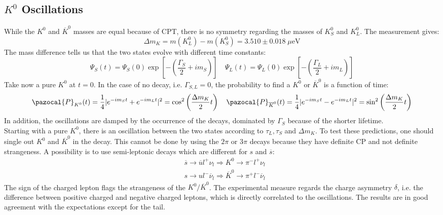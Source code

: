 \documentclass[10.75pt,a4paper,openright,bottom=2cm]{article}
\begin{document}
\subsection{$K^0$ Oscillations}
While the $K^0$ and $\overline{K}^0$ masses are equal because of CPT, there is no symmetry regarding the masses of $K_S^0$ and $K_L^0$. The measurement gives:
\[
\Delta m_K=m(K_L^0)-m(K_S^0)=3.510\pm0.018\;\text{$\mu$eV}
\]
The mass difference tells us that the two states evolve with different time constants:
\[
\Psi_S(t)=\Psi_S(0)\exp\left[-\left(\frac{\Gamma_S}{2}+im_S\right)\right] \quad \Psi_L(t)=\Psi_L(0)\exp\left[-\left(\frac{\Gamma_L}{2}+im_L\right)\right]
\]
Take now a pure $K^0$ at $t=0$. In the case of no decay, i.e. $\Gamma_{S,L}=0$, the probability to find a $K^0$ or $\overline{K}^0$ is a function of time:
\[
\pazocal{P}_{K^0}(t)=\frac{1}{4}|e^{-im_St}+e^{-im_Lt}|^2=\cos^2\left(\frac{\Delta m_K}{2}t\right) \quad \pazocal{P}_{\overline{K}^0}(t)=\frac{1}{4}|e^{-im_St}-e^{-im_Lt}|^2=\sin^2\left(\frac{\Delta m_K}{2}t\right)
\]
In addition, the oscillations are damped by the occurrence of the decays, dominated by $\Gamma_S$ because of the shorter lifetime.\\
Starting with a pure $K^0$, there is an oscillation between the two states according to $\tau_L, \tau_S$ and $\Delta m_K$. To test these predictions, one should single out $K^0$ and $\overline{K}^0$ in the decay. This cannot be done by using the $2\pi$ or $3\pi$ decays because they have definite CP and not definite strangeness. A possibility is to use semi-leptonic decays which are different for $s$ and $\overline{s}$:
\[
\begin{aligned}
&\overline{s}\to\overline{u}l^+\nu_l\Rightarrow K^0\to\pi^-l^+\nu_l\\
&s\to ul^-\overline{\nu}_l\Rightarrow\overline{K}^0\to\pi^+l^-\overline{\nu}_l
\end{aligned}
\]
The sign of the charged lepton flags the strangeness of the $K^0/\overline{K}^0$. The experimental measure regards the charge asymmetry $\delta$, i.e. the difference between positive charged and negative charged leptons, which is directly correlated to the oscillations. The results are in good agreement with the expectations except for the tail.
\end{document}

